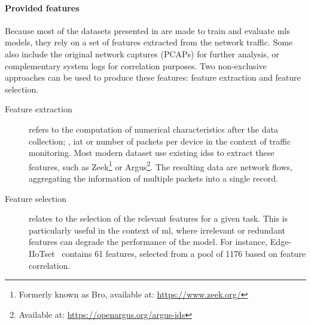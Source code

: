 
\begin{table}
  \centering
  \caption{
    Most common feature-based datasets for \glspl{nids}.
    \label{tbl:datasets}  
  }
  
  \end{table}

\paragraph{Provided features}

Because most of the datasets presented in  are made to train and evaluate \glspl{ml} models, they rely on a set of features extracted from the network traffic.
Some also include the original network captures (PCAPs) for further analysis, or complementary system logs for correlation purposes.
Two non-exclusive approaches can be used to produce these features: feature extraction and feature selection.

\begin{description}
  \item[Feature extraction] refers to the computation of numerical characteristics after the data collection; \eg, \gls{iat} or number of packets per device in the context of traffic monitoring.
  Most modern dataset use existing \glspl{ids} to extract these features, such as Zeek\footnote{Formerly known as Bro, available at: \url{https://www.zeek.org/}} or Argus\footnote{Available at: \url{https://openargus.org/argus-ids}}.
  The resulting data are network flows, aggregating the information of multiple packets into a single record.

  \item[Feature selection] relates to the selection of the relevant features for a given task.
  This is particularly useful in the context of \gls{ml}, where irrelevant or redundant features can degrade the performance of the model.
  For instance, Edge-IIoTset~\cite{ferrag_EdgeIIoTsetNewComprehensive_2022} contains 61 features, selected from a pool of 1176 based on feature correlation.
\end{description}

